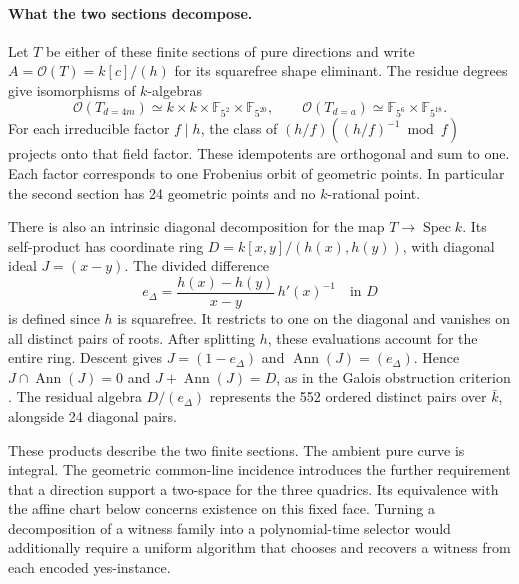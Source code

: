 

\paragraph{What the two sections decompose.}
Let \(T\) be either of these finite sections of pure directions and write
\(A=\mathcal O(T)=k[c]/(h)\) for its squarefree shape eliminant.
The residue degrees give isomorphisms of \(k\)-algebras
\[
 \mathcal O(T_{d=4m})\simeq
 k\times k\times\mathbb F_{5^2}\times\mathbb F_{5^{20}},
 \qquad
 \mathcal O(T_{d=a})\simeq\mathbb F_{5^6}\times\mathbb F_{5^{18}}.
\]
For each irreducible factor \(f\mid h\), the class of
\((h/f)((h/f)^{-1}\bmod f)\) projects onto that field factor. These
idempotents are orthogonal and sum to one. Each factor corresponds to
one Frobenius orbit of geometric points. In particular the second
section has 24 geometric points and no \(k\)-rational point.

There is also an intrinsic diagonal decomposition for the map
\(T\to\operatorname{Spec} k\). Its self-product has coordinate ring
\(D=k[x,y]/(h(x),h(y))\), with diagonal ideal \(J=(x-y)\).
The divided difference
\[
    e_\Delta=\frac{h(x)-h(y)}{x-y}\,h'(x)^{-1}\quad\text{in }D
\]
is defined since \(h\) is squarefree. It restricts to one on the
diagonal and vanishes on all distinct pairs of roots. After splitting
\(h\), these evaluations account for the entire ring. Descent gives
\(J=(1-e_\Delta)\) and \(\operatorname{Ann}(J)=(e_\Delta)\). Hence
\(J\cap\operatorname{Ann}(J)=0\) and \(J+\operatorname{Ann}(J)=D\),
as in the Galois obstruction criterion \cite{gotCollisionDefect}.
The residual algebra \(D/(e_\Delta)\) represents the 552 ordered
distinct pairs over \(\bar k\), alongside 24 diagonal pairs.

These products describe the two finite sections. The ambient pure
curve is integral. The geometric common-line incidence introduces the
further requirement that a direction support a two-space for the three
quadrics. Its equivalence with the affine chart below concerns existence
on this fixed face. Turning a decomposition of a witness family into
a polynomial-time selector would additionally require a uniform algorithm
that chooses and recovers a witness from each encoded yes-instance.

